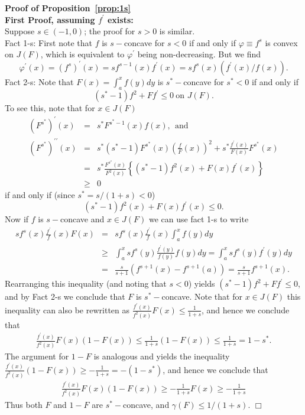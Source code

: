 \documentclass[11pt]{amsart}
\numberwithin{equation}{section}
\def\st{\ensuremath{s^*}}
\theoremstyle{definition}\newtheorem{definition}{Definition}
\theoremstyle{remark}\newtheorem{assumption}{Assumption}
\theoremstyle{remark}\newtheorem{remark}{Remark}
\theoremstyle{definition}\newtheorem{example}{Example}
\theoremstyle{plain}\newtheorem{question}{Question}
\theoremstyle{plain}\newtheorem{theorem}{Theorem}
\theoremstyle{plain}\newtheorem{lemma}{Lemma}
\theoremstyle{plain}\newtheorem{proposition}{Proposition}
\theoremstyle{plain}\newtheorem{corollary}{Corollary}
\theoremstyle{plain}\newtheorem{conjecture}{Conjecture}
\begin{document}
\par\noindent
{\bf Proof of Proposition~\ref{prop:1s}} \\
{\bf First Proof, assuming $f^{\prime}$ exists:}  \\
Suppose $s\in(-1,0)$; the proof for $s>0$ is similar. \\
Fact 1-s:  First note that $f$ is $s-$concave for $s<0$ if and only if $\varphi \equiv f^{s}$ is convex on $J(F)$, which is 
equivalent to $\varphi^{\prime}$  being non-decreasing. But we find
$$
\varphi^{\prime} (x) = (f^s)^{\prime} (x) = s f^{s-1} (x) f^{\prime} (x) = s f^s (x) (f^{\prime} (x) / f(x) ) .
$$
Fact 2-s:  Note that $F(x) = \int_a^x f(y) dy$ is $s^*-$concave for $\st<0$ if and only if 
$$
(s^*-1) f^2 + F f^{\prime}   \le 0\ \text{on }J(F). 
$$  
To see this, note that for $x\in J(F)$
\begin{eqnarray*}
( F^{s^*})^{\prime} (x) & = & s^* F^{s^*-1}(x) f(x) , \ \ \mbox{and}\\
(F^{s^*})^{\prime \prime} (x) 
& = & s^* (s^*-1) F^{s^*} (x)  \left ( \frac{f}{F} (x) \right )^2 + s^* \frac{f^{\prime}(x)}{F(x)} F^{s^*} (x) \\
& = & s^* \frac{F^{s^*}(x)}{F^2 (x)} \left \{ (s^*-1) f^2 (x) + F(x) f^{\prime} (x) \right \} \\
& \ge & 0
\end{eqnarray*}
if and only if (since $s^* = s/(1+s) < 0$)
$$
(s^*-1) f^2 (x) + F(x) f^{\prime}(x) \le 0.
$$
Now if $f$ is $s-$concave and $x\in J(F)$ we can use fact 1-s to write
\begin{eqnarray*}
s f^s (x) \frac{f^{\prime}}{f} (x) F(x) 
& = & s f^s (x) \frac{f^{\prime}}{f} (x)\int_a^x f(y) dy \\
& \ge & \int_a^x s f^s (y) \frac{f^{\prime} (y)}{f(y)} f(y) dy = \int_a^x s f^s (y) f^{\prime} (y) dy \\
& = & \frac{s}{s+1} \left ( f^{s+1} (x) - f^{s+1}(a)\right ) = \frac{s}{s+1} f^{s+1} (x) .
\end{eqnarray*}
Rearranging this inequality (and noting that $s<0$) yields 
$(s^*-1) f^2 + F f^{\prime}   \le 0$, 
and by Fact 2-s we conclude that $F$ is $s^*-$concave.
Note that for $x \in J(F)$ this inequality can also be rewritten as 
$\frac{f^{\prime} (x)}{f^2 (x)} F(x) \le \frac{1}{1+s}$,
and hence we conclude that 
\begin{eqnarray*}
\frac{f^{\prime} (x)}{f^2 (x)} F(x)(1-F(x)) \le \frac{1}{1+s} (1-F(x)) \le \frac{1}{1+s}  = 1 - s^* .
\end{eqnarray*}
The argument for $1-F$ is analogous and yields the inequality 
$\frac{f^{\prime} (x)}{f^2 (x)} (1-F(x)) \ge - \frac{1}{1+s} = - (1-s^*)$,
and hence we conclude that 
\begin{eqnarray*}
\frac{f^{\prime} (x)}{f^2 (x)} F(x)(1-F(x)) \ge - \frac{1}{1+s} F(x) \ge - \frac{1}{1+s}
\end{eqnarray*}
Thus both $F$ and $1-F$ are $s^*-$concave, and $\gamma (F) \le 1/(1+s)$. 
\hfill $\Box$
\medskip
\end{document}
